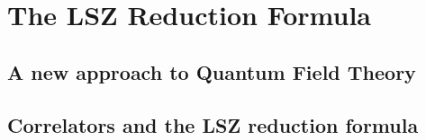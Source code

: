 \documentclass[../main/main.tex]{subfiles}
\begin{document}
\chapter{The LSZ Reduction Formula}

\section{A new approach to Quantum Field Theory}











\section{Correlators and the LSZ reduction formula}
\end{document}
